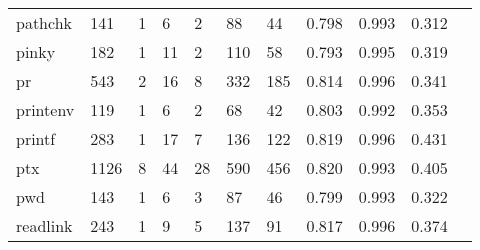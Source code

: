 \begin{longtable}{lp{1.10cm}p{1.10cm}p{1.10cm}p{1.10cm}p{1.10cm}p{1.10cm}p{1.10cm}p{1.10cm}p{1.10cm}p{1.10cm}}
pathchk   &                    141 &                                  1 &                                 6 &                                2 &                                88 &                              44 &                             0.798 &                                 0.993 &                               0.312 \\
pinky     &                    182 &                                  1 &                                11 &                                2 &                               110 &                              58 &                             0.793 &                                 0.995 &                               0.319 \\
pr        &                    543 &                                  2 &                                16 &                                8 &                               332 &                             185 &                             0.814 &                                 0.996 &                               0.341 \\
printenv  &                    119 &                                  1 &                                 6 &                                2 &                                68 &                              42 &                             0.803 &                                 0.992 &                               0.353 \\
printf    &                    283 &                                  1 &                                17 &                                7 &                               136 &                             122 &                             0.819 &                                 0.996 &                               0.431 \\
ptx       &                   1126 &                                  8 &                                44 &                               28 &                               590 &                             456 &                             0.820 &                                 0.993 &                               0.405 \\
pwd       &                    143 &                                  1 &                                 6 &                                3 &                                87 &                              46 &                             0.799 &                                 0.993 &                               0.322 \\
readlink  &                    243 &                                  1 &                                 9 &                                5 &                               137 &                              91 &                             0.817 &                                 0.996 &                               0.374 \\

\end{longtable}
